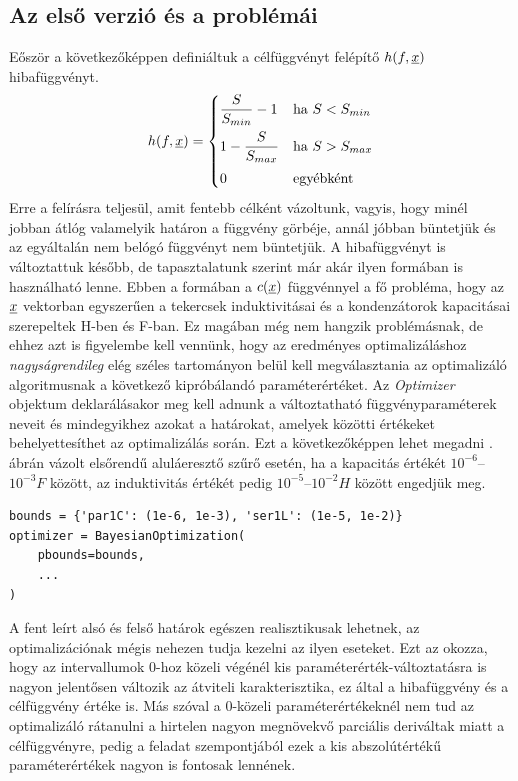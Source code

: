 	\subsection{Az első verzió és a problémái}
        Eőször a következőképpen definiáltuk a célfüggvényt felépítő $h(f,\underline{x})$ hibafüggvényt.
        \begin{equation}
            h(f,\underline{x}) =
            \begin{cases}
                \dfrac{S}{S_{min}}-1 & \mbox{ha } S<S_{min}\\[2ex]
                1-\dfrac{S}{S_{max}} & \mbox{ha } S>S_{max}\\[2ex]
                0 & \text{egyébként}
            \end{cases}
        \end{equation}
        Erre a felírásra teljesül, amit fentebb célként vázoltunk, vagyis, hogy minél jobban átlóg valamelyik határon a függvény görbéje, annál jóbban büntetjük és az egyáltalán nem belógó függvényt nem büntetjük. A hibafüggvényt is változtattuk később, de tapasztalatunk szerint már akár ilyen formában is használható lenne. Ebben a formában a $c(\underline{x})$ függvénnyel a fő probléma, hogy az $\underline{x}$ vektorban egyszerűen a tekercsek induktivitásai és a kondenzátorok kapacitásai szerepeltek H-ben és F-ban. Ez magában még nem hangzik problémásnak, de ehhez azt is figyelembe kell vennünk, hogy az eredményes optimalizáláshoz \emph{nagyságrendileg} elég széles tartományon belül kell megválasztania az optimalizáló algoritmusnak a következő kipróbálandó paraméterértéket.
        Az \emph{Optimizer} objektum deklarálásakor meg kell adnunk a változtatható függvényparaméterek neveit és mindegyikhez azokat a határokat, amelyek közötti értékeket behelyettesíthet az optimalizálás során. Ezt a következőképpen lehet megadni . ábrán vázolt elsőrendű aluláeresztő szűrő esetén, ha a kapacitás értékét $10^{-6}$--$10^{-3}\si{F}$ között, az induktivitás értékét pedig $10^{-5}$--$10^{-2}\si{H}$ között engedjük meg.
        \begin{lstlisting}
bounds = {'par1C': (1e-6, 1e-3), 'ser1L': (1e-5, 1e-2)}
optimizer = BayesianOptimization(
    pbounds=bounds,
    ...
)
\end{lstlisting}

        A fent leírt alsó és felső határok egészen realisztikusak lehetnek, az optimalizációnak mégis nehezen tudja kezelni az ilyen eseteket. Ezt az okozza, hogy az intervallumok 0-hoz közeli végénél kis paraméterérték-változtatásra is nagyon jelentősen változik az átviteli karakterisztika, ez által a hibafüggvény és a célfüggvény értéke is. Más szóval a 0-közeli paraméterértékeknél nem tud az optimalizáló rátanulni a hirtelen nagyon megnövekvő parciális deriváltak miatt a célfüggvényre, pedig a feladat szempontjából ezek a kis abszolútértékű paraméterértékek nagyon is fontosak lennének.

